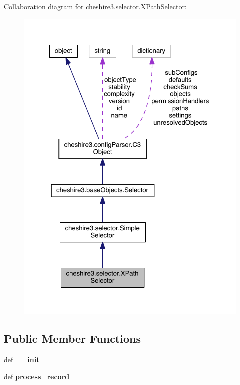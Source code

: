 Collaboration diagram for cheshire3.\-selector.\-X\-Path\-Selector\-:
\nopagebreak
\begin{figure}[H]
\begin{center}
\leavevmode
\includegraphics[width=325pt]{classcheshire3_1_1selector_1_1_x_path_selector__coll__graph}
\end{center}
\end{figure}
\subsection*{Public Member Functions}
\begin{DoxyCompactItemize}
\item 
\hypertarget{classcheshire3_1_1selector_1_1_x_path_selector_a8c3a82c6129ae18ee231c848cc79d5e5}{def {\bfseries \-\_\-\-\_\-init\-\_\-\-\_\-}}\label{classcheshire3_1_1selector_1_1_x_path_selector_a8c3a82c6129ae18ee231c848cc79d5e5}

\item 
\hypertarget{classcheshire3_1_1selector_1_1_x_path_selector_af273564a4c0636acdedea3ae28caa2c9}{def {\bfseries process\-\_\-record}}\label{classcheshire3_1_1selector_1_1_x_path_selector_af273564a4c0636acdedea3ae28caa2c9}

\end{DoxyCompactItemize}
